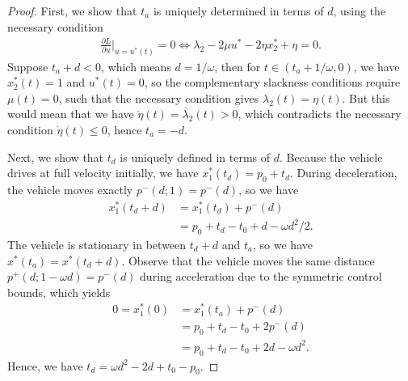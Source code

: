\documentclass[a4paper]{article}
\theoremstyle{definition}
\theoremstyle{plain}
\begin{document}
\begin{proof}
First, we show that $t_{a}$ is uniquely determined in terms of $d$, using the
necessary condition
\begin{align}
  \label{eq:Lu}
  \frac{\partial L}{\partial u} |_{u=u^{*}(t)} = 0 \iff \lambda_{2} - 2 \mu u^{*} - 2 \eta x_{2}^{*} + \eta = 0 .
\end{align}
Suppose $t_{a} + d < 0$, which means $d = 1 / \omega$, then for
$t \in (t_{a} + 1 / \omega, 0)$, we have $x_{2}^{*}(t) = 1$ and $u^{*}(t) = 0$, so the
complementary slackness conditions require $\mu(t) = 0$, such that the necessary
condition gives $\lambda_{2}(t) = \eta(t)$. But this would mean that we have
$\dot{\eta}(t) = \dot{\lambda_{2}}(t) > 0$, which contradicts the necessary condition
$\dot{\eta}(t) \leq 0$, hence $t_{a} = - d$.

Next, we show that $t_{d}$ is uniquely defined in terms of $d$.
%
Because the vehicle drives at full velocity initially, we have
$x_{1}^{*}(t_{d}) = p_{0} + t_{d}$.
%
During deceleration, the vehicle moves exactly $p^{-}(d ; 1) = p^{-}(d)$, so we have
\begin{align*}
  x_{1}^{*}(t_{d} + d) &= x_{1}^{*}(t_{d}) + p^{-}(d) \\
  &= p_{0} + t_{d} - t_{0} + d - \omega d^{2} / 2 .
\end{align*}
%
The vehicle is stationary in between $t_{d} + d$ and $t_{a}$, so we have
$x^{*}(t_{a}) = x^{*}(t_{d} + d)$. Observe that the vehicle moves the same distance
$p^{+}(d; 1 - \omega d) = p^{-}(d)$ during acceleration due to the symmetric
control bounds, which yields
\begin{align*}
  0 = x_{1}^{*}(0) &= x_{1}^{*}(t_{a}) + p^{-}(d) \\
                   &= p_{0} + t_{d} - t_{0} + 2 p^{-}(d) \\
                   &= p_{0} + t_{d} - t_{0} + 2d - \omega d^{2} .
\end{align*}
%
Hence, we have $t_{d} = \omega d^{2} - 2d + t_{0} - p_{0}$.


\end{proof}
\end{document}
